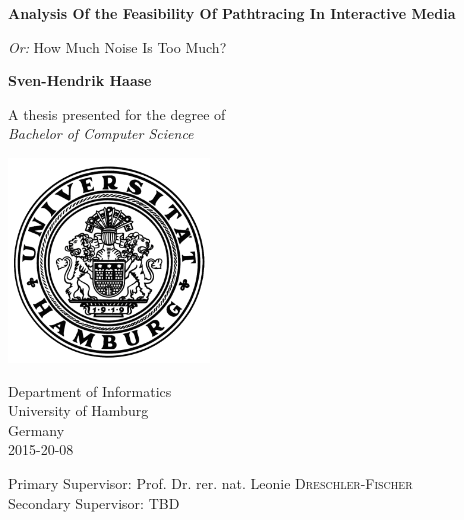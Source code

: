 \begin{titlepage}
    \begin{center}
        \Huge
        \textbf{Analysis Of the Feasibility Of Pathtracing In Interactive Media}
        
        \vspace{0.5cm}

        \LARGE
        \textit{Or:} How Much Noise Is Too Much?
        
        \vspace{1.5cm}
        
        \textbf{Sven-Hendrik Haase}
        
        \vfill
        
        A thesis presented for the degree of\\
        \emph{Bachelor of Computer Science}
        
        \vspace{0.8cm}
        
        \includegraphics[width=0.4\textwidth]{frontbackmatter/uni-siegel.png}
        
        \Large
        Department of Informatics\\
        University of Hamburg\\
        Germany\\
        2015-20-08

        \vspace{0.8cm}

        \large
        Primary Supervisor: Prof. Dr. rer. nat. Leonie \textsc{Dreschler-Fischer}\\
        Secondary Supervisor: \textsc{TBD}
        
    \end{center}
\end{titlepage}
